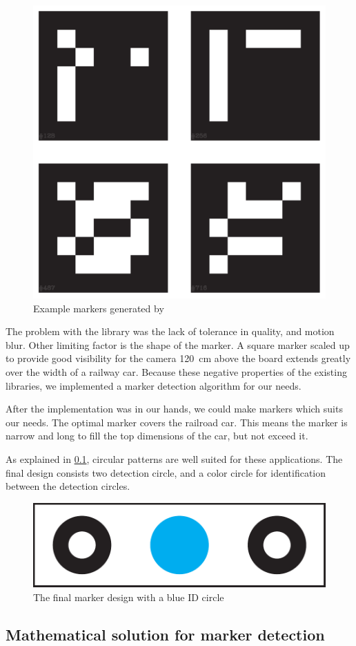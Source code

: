 \begin{figure}[h]
	\centering
	\includegraphics[width=0.35\linewidth]{include/figures/chapter_6/opencv_2}
	\caption{Example markers generated by }
	\label{fig:case_study:aruco_markers}
\end{figure}

The problem with the library was the lack of tolerance in quality, and motion blur. Other limiting factor is the shape of the marker. A square marker scaled up to provide good visibility for the camera 120~\si{\centi\meter} above the board extends greatly over the width of a railway car. Because these negative properties of the existing libraries, we implemented a marker detection algorithm for our needs.

After the implementation was in our hands, we could make markers which suits our needs. The optimal marker covers the railroad car. This means the marker is narrow and long to fill the top dimensions of the car, but not exceed it.

As explained in \cref{fig:case_study:opencv_math}, circular patterns are well suited for these applications. The final design consists two detection circle, and a color circle for identification between the detection circles.

\begin{figure}[h]
	\centering
	\includegraphics[width=0.75\linewidth]{include/figures/chapter_6/opencv_3}
	\caption{The final marker design with a blue ID circle}
	\label{fig:case_study:marker}
\end{figure}

\subsection{Mathematical solution for marker detection}
\label{fig:case_study:opencv_math}

